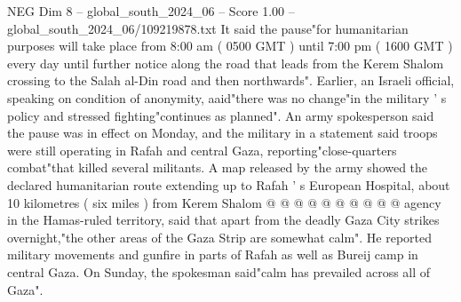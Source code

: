 \begin{textsample}{NEG Dim 8 – global\_south\_2024\_06 – Score 1.00 – global\_south\_2024\_06/109219878.txt}
It said the pause"for humanitarian purposes will take place from 8:00 am ( 0500 GMT ) until 7:00 pm ( 1600 GMT ) every day until further notice along the road that leads from the Kerem Shalom crossing to the Salah al-Din road and then northwards".
Earlier, an Israeli official, speaking on condition of anonymity, aaid"there was no change"in the military ' s policy and stressed fighting"continues as planned".
An army spokesperson said the pause was in effect on Monday, and the military in a statement said troops were still operating in Rafah and central Gaza, reporting"close-quarters combat"that killed several militants.
A map released by the army showed the declared humanitarian route extending up to Rafah ' s European Hospital, about 10 kilometres ( six miles ) from Kerem Shalom @ @ @ @ @ @ @ @ @ @ agency in the Hamas-ruled territory, said that apart from the deadly Gaza City strikes overnight,"the other areas of the Gaza Strip are somewhat calm".
He reported military movements and gunfire in parts of Rafah as well as Bureij camp in central Gaza.
On Sunday, the spokesman said"calm has prevailed across all of Gaza".

\end{textsample}

